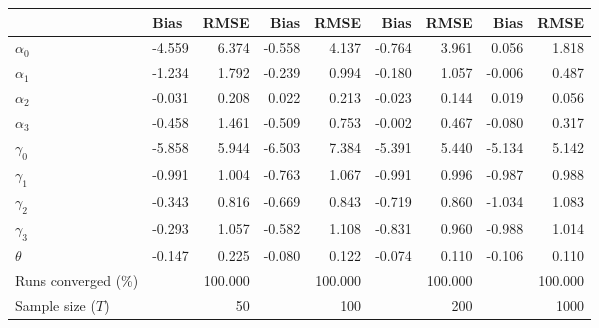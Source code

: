 
\begin{tabular}[t]{llrrrrrrr}
\toprule
  & Bias & RMSE & Bias & RMSE & Bias & RMSE & Bias & RMSE\\
\midrule
$\alpha_{0}$ & -4.559 & 6.374 & -0.558 & 4.137 & -0.764 & 3.961 & 0.056 & 1.818\\
$\alpha_{1}$ & -1.234 & 1.792 & -0.239 & 0.994 & -0.180 & 1.057 & -0.006 & 0.487\\
$\alpha_{2}$ & -0.031 & 0.208 & 0.022 & 0.213 & -0.023 & 0.144 & 0.019 & 0.056\\
$\alpha_{3}$ & -0.458 & 1.461 & -0.509 & 0.753 & -0.002 & 0.467 & -0.080 & 0.317\\
$\gamma_{0}$ & -5.858 & 5.944 & -6.503 & 7.384 & -5.391 & 5.440 & -5.134 & 5.142\\
$\gamma_{1}$ & -0.991 & 1.004 & -0.763 & 1.067 & -0.991 & 0.996 & -0.987 & 0.988\\
$\gamma_{2}$ & -0.343 & 0.816 & -0.669 & 0.843 & -0.719 & 0.860 & -1.034 & 1.083\\
$\gamma_{3}$ & -0.293 & 1.057 & -0.582 & 1.108 & -0.831 & 0.960 & -0.988 & 1.014\\
$\theta$ & -0.147 & 0.225 & -0.080 & 0.122 & -0.074 & 0.110 & -0.106 & 0.110\\
Runs converged (\%) &  & 100.000 &  & 100.000 &  & 100.000 &  & 100.000\\
Sample size ($T$) &  & 50 &  & 100 &  & 200 &  & 1000\\
\bottomrule
\end{tabular}
